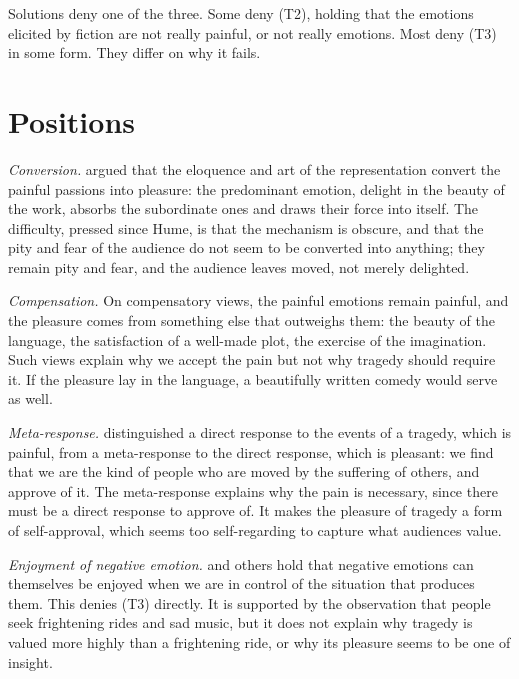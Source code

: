 \documentclass{situationist-preprint}
\begin{document}
Solutions deny one of the three. Some deny (T2), holding that the emotions elicited by fiction are not really painful, or not really emotions. Most deny (T3) in some form. They differ on why it fails.

\section{Positions}

\emph{Conversion.} \citet{Hume1757} argued that the eloquence and art of the representation convert the painful passions into pleasure: the predominant emotion, delight in the beauty of the work, absorbs the subordinate ones and draws their force into itself. The difficulty, pressed since Hume, is that the mechanism is obscure, and that the pity and fear of the audience do not seem to be converted into anything; they remain pity and fear, and the audience leaves moved, not merely delighted.

\emph{Compensation.} On compensatory views, the painful emotions remain painful, and the pleasure comes from something else that outweighs them: the beauty of the language, the satisfaction of a well-made plot, the exercise of the imagination. Such views explain why we accept the pain but not why tragedy should require it. If the pleasure lay in the language, a beautifully written comedy would serve as well.

\emph{Meta-response.} \citet{Feagin1983} distinguished a direct response to the events of a tragedy, which is painful, from a meta-response to the direct response, which is pleasant: we find that we are the kind of people who are moved by the suffering of others, and approve of it. The meta-response explains why the pain is necessary, since there must be a direct response to approve of. It makes the pleasure of tragedy a form of self-approval, which seems too self-regarding to capture what audiences value.

\emph{Enjoyment of negative emotion.} \citet{Morreall1985} and others hold that negative emotions can themselves be enjoyed when we are in control of the situation that produces them. This denies (T3) directly. It is supported by the observation that people seek frightening rides and sad music, but it does not explain why tragedy is valued more highly than a frightening ride, or why its pleasure seems to be one of insight.
\end{document}
